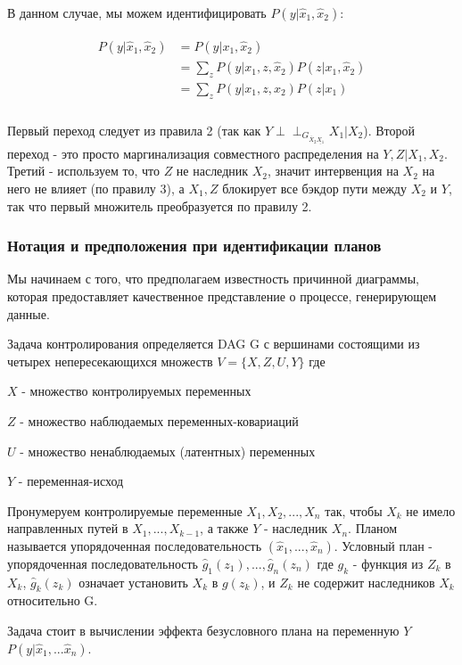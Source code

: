 \documentclass[fleqn]{article}
\newcommand{\independent}{\perp \!\!\! \perp}
\numberwithin{equation}{section}
\numberwithin{theorem}{section}
\numberwithin{figure}{section}
\numberwithin{lemma}{section}
\begin{document}
В данном случае, мы можем идентифицировать $P(y | \hat x_1, \hat x_2)$:

\begin{align}
	\begin{split}
	P(y | \hat x_1, \hat x_2) &= P(y|x_1, \hat x_2) \\
	&= \sum\limits_{z} P(y|x_1,z, \hat x_2)P(z|x_1,\hat x_2)\\
	&= \sum\limits_{z} P(y|x_1,z, x_2)P(z|x_1)\\
	\end{split}
\end{align}

Первый переход следует из правила 2 (так как $Y \independent_{G_{\overline X_2 \underline{X_1}}} X_1 | X_2$). Второй переход - это просто маргинализация совместного распределения на $Y,Z | X_1, X_2$. Третий - используем то, что $Z$ не наследник $X_2$, значит интервенция на $X_2$ на него не влияет (по правилу 3), а $X_1, Z$ блокирует все бэкдор пути между $X_2$ и $Y$, так что первый множитель преобразуется по правилу 2. 

\subsubsection*{Нотация и предположения при идентификации планов}

Мы начинаем с того, что предполагаем известность причинной диаграммы, которая предоставляет качественное представление о процессе, генерирующем данные. 

Задача контролирования определяется DAG G с вершинами состоящими из четырех непересекающихся множеств $V = \{X,Z,U,Y\}$ где 

$X$ - множество контролируемых переменных 

$Z$ - множество наблюдаемых  переменных-ковариаций

$U$ - множество ненаблюдаемых (латентных) переменных

$Y$ - переменная-исход

Пронумеруем контролируемые переменные $X_1,X_2,...,X_n$ так, чтобы $X_k$ не имело направленных путей в $X_1,...,X_{k-1}$, а также $Y$ - наследник $X_n$. Планом называется упорядоченная последовательность $(\hat x_1, ..., \hat x_n)$. Условный план - упорядоченная последовательность $\hat g_1(z_1), ..., \hat g_n(z_n)$ где $g_k$ - функция из $Z_k$ в $X_k$, $\hat g_k(z_k)$ означает установить $X_k$ в $g(z_k)$, и $Z_k$ не содержит наследников $X_k$ относительно G.

Задача стоит в вычислении эффекта безусловного плана на переменную $Y$ $P(y|\hat x_1, ...\hat x_n)$. 
\end{document}
